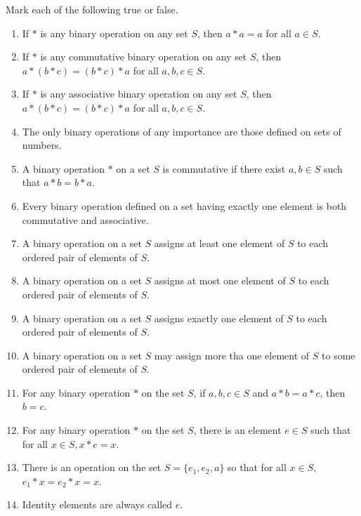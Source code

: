 \begin{exercise}
    Mark each of the following true or false.
    \begin{enumerate}[label={\textbf{\alph*.}},itemsep=0pt,topsep=0pt]
        \item If $*$ is any binary operation on any set $S$, then $a * a = a$ for all $a\in S$.
        \item If $*$ is any commutative binary operation on any set $S$, then $a * (b * c) = (b * c) * a$ for all $a, b, c \in S$.
        \item If $*$ is any associative binary operation on any set $S$, then $a * (b * c) = (b * c) * a$ for all $a, b, c \in S$.
        \item The only binary operations of any importance are those defined on sets of numbers.
        \item A binary operation $*$ on a set $S$ is commutative if there exist $a, b \in S$ such that $a * b = b * a$.
        \item Every binary operation defined on a set having exactly one element is both commutative and associative.
        \item A binary operation on a set $S$ assigns at least one element of $S$ to each ordered pair of elements of $S$.
        \item A binary operation on a set $S$ assigns at most one element of $S$ to each ordered pair of elements of $S$.
        \item A binary operation on a set $S$ assigns exactly one element of $S$ to each ordered pair of elements of $S$.
        \item A binary operation on a set $S$ may assign more tha one element of $S$ to some ordered pair of elements of $S$.
        \item For any binary operation $*$ on the set $S$, if $a, b, c\in S$ and $a * b = a * c$, then $b = c$.
        \item For any binary operation $*$ on the set $S$, there is an element $e\in S$ such that for all $x\in S, x * e = x$.
        \item There is an operation on the set $S = \{ e_{1}, e_{2}, a \}$ so that for all $x\in S$, $e_{1} * x = e_{2} * x = x$.
        \item Identity elements are always called $e$.
    \end{enumerate}
\end{exercise}

